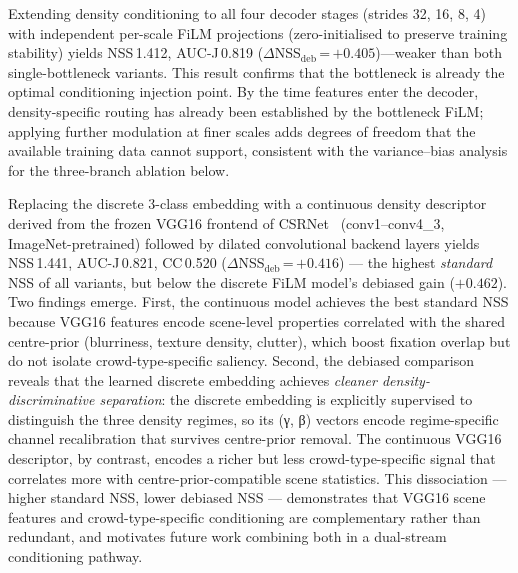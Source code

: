 \documentclass[twocolumn]{article}
\begin{document}
Extending density conditioning to all four decoder stages (strides 32, 16, 8, 4)
with independent per-scale FiLM projections (zero-initialised to preserve
training stability) yields NSS\,1.412, AUC-J\,0.819
($\Delta$NSS$_\text{deb}$\,=\,$+0.405$)---weaker than both single-bottleneck
variants.  This result confirms that the bottleneck is already the optimal
conditioning injection point.  By the time features enter the decoder,
density-specific routing has already been established by the bottleneck FiLM;
applying further modulation at finer scales adds degrees of freedom that the
available training data cannot support, consistent with the variance--bias
analysis for the three-branch ablation below.

Replacing the discrete 3-class embedding with a continuous density descriptor derived
from the frozen VGG16 frontend of CSRNet~\citep{csrnet} (conv1--conv4\_3, ImageNet-pretrained)
followed by dilated convolutional backend layers yields NSS\,1.441, AUC-J\,0.821,
CC\,0.520 ($\Delta$NSS$_\text{deb}$\,=\,$+0.416$) --- the highest \emph{standard} NSS
of all variants, but below the discrete FiLM model's debiased gain ($+0.462$).
Two findings emerge.  First, the continuous model achieves the best standard NSS
because VGG16 features encode scene-level properties correlated with the shared
centre-prior (blurriness, texture density, clutter), which boost fixation overlap
but do not isolate crowd-type-specific saliency.
Second, the debiased comparison reveals that the learned discrete embedding achieves
\emph{cleaner density-discriminative separation}: the discrete embedding is explicitly
supervised to distinguish the three density regimes, so its (γ, β) vectors encode
regime-specific channel recalibration that survives centre-prior removal.
The continuous VGG16 descriptor, by contrast, encodes a richer but less crowd-type-specific
signal that correlates more with centre-prior-compatible scene statistics.
This dissociation --- higher standard NSS, lower debiased NSS --- demonstrates that
VGG16 scene features and crowd-type-specific conditioning are complementary rather than
redundant, and motivates future work combining both in a dual-stream conditioning pathway.
\end{document}
